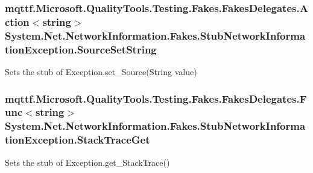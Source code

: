 \hypertarget{class_system_1_1_net_1_1_network_information_1_1_fakes_1_1_stub_network_information_exception_acef03bf11930d3e0e4717d713da34ae1}{
\subsubsection[{Source\-Set\-String}]{\setlength{\rightskip}{0pt plus 5cm}mqttf.\-Microsoft.\-Quality\-Tools.\-Testing.\-Fakes.\-Fakes\-Delegates.\-Action$<$string$>$ System.\-Net.\-Network\-Information.\-Fakes.\-Stub\-Network\-Information\-Exception.\-Source\-Set\-String}}\label{class_system_1_1_net_1_1_network_information_1_1_fakes_1_1_stub_network_information_exception_acef03bf11930d3e0e4717d713da34ae1}


Sets the stub of Exception.\-set\-\_\-\-Source(\-String value)

\hypertarget{class_system_1_1_net_1_1_network_information_1_1_fakes_1_1_stub_network_information_exception_ab5cfb913ed8e5cc35ec40275e41b20dc}{
\subsubsection[{Stack\-Trace\-Get}]{\setlength{\rightskip}{0pt plus 5cm}mqttf.\-Microsoft.\-Quality\-Tools.\-Testing.\-Fakes.\-Fakes\-Delegates.\-Func$<$string$>$ System.\-Net.\-Network\-Information.\-Fakes.\-Stub\-Network\-Information\-Exception.\-Stack\-Trace\-Get}}\label{class_system_1_1_net_1_1_network_information_1_1_fakes_1_1_stub_network_information_exception_ab5cfb913ed8e5cc35ec40275e41b20dc}


Sets the stub of Exception.\-get\-\_\-\-Stack\-Trace()

